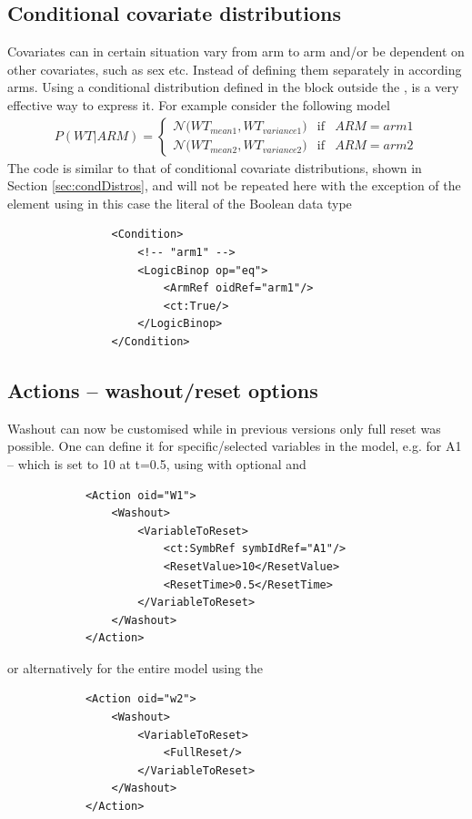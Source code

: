 \subsection{Conditional covariate distributions}
\label{subsec:condDistrib}
Covariates can in certain situation vary from arm to arm and/or be dependent 
on other covariates, such as sex etc.
Instead of defining them separately in according arms. Using a conditional 
distribution defined in the  block outside the ,
is a very effective way to express it. For example consider the following model
\begin{align}
P(WT|ARM) = 
\left\{ \begin{array}{rcl}     
\mathcal N \big(WT_{mean1}, WT_{variance1}\big) & \mbox{if} & ARM = arm1\\  
\mathcal N \big(WT_{mean2}, WT_{variance2}\big) & \mbox{if} & ARM = arm2 
\end{array}\right. \nonumber
\end{align}
The code is similar to that of conditional covariate distributions, 
shown in Section \ref{sec:condDistros}, and will not be repeated here with the 
exception of the  element using in this case the literal 
of the Boolean data type
\lstset{language=XML}
\begin{lstlisting}
                <Condition>
                    <!-- "arm1" -->
                    <LogicBinop op="eq">
                        <ArmRef oidRef="arm1"/>
                        <ct:True/>
                    </LogicBinop>
                </Condition>
\end{lstlisting}


\subsection{Actions -- washout/reset options}
Washout can now be customised while in previous versions only
full reset was possible. One can define it for specific/selected variables 
in the model, e.g. for A1 -- which is set to 10 at t=0.5, using 
 with optional  and 
\lstset{language=XML}
\begin{lstlisting}
            <Action oid="W1">
                <Washout>
                    <VariableToReset>
                        <ct:SymbRef symbIdRef="A1"/>
                        <ResetValue>10</ResetValue>
                        <ResetTime>0.5</ResetTime>
                    </VariableToReset>
                </Washout>
            </Action>
\end{lstlisting}
or alternatively for the entire model using the 
\lstset{language=XML}
\begin{lstlisting}
            <Action oid="w2">
                <Washout>
                    <VariableToReset>
                        <FullReset/>
                    </VariableToReset>
                </Washout>
            </Action>
\end{lstlisting}

